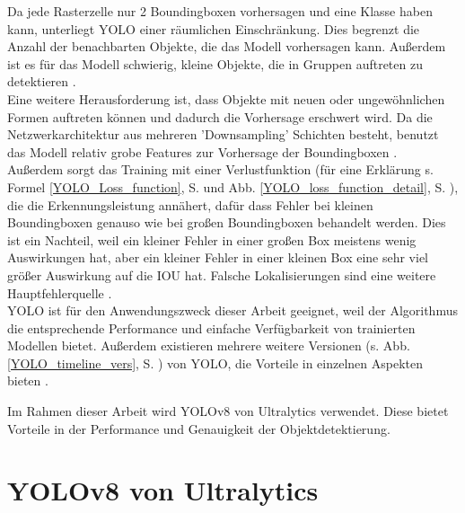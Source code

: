 {{	Da jede Rasterzelle nur 2 Boundingboxen vorhersagen und eine Klasse haben kann, unterliegt YOLO einer räumlichen Einschränkung. Dies begrenzt die Anzahl der benachbarten Objekte, die das Modell vorhersagen kann. Außerdem ist es für das Modell schwierig, kleine Objekte, die in Gruppen auftreten zu detektieren \citep{Redmon2016}. \\
	Eine weitere Herausforderung ist, dass Objekte mit neuen oder ungewöhnlichen Formen auftreten können und dadurch die Vorhersage erschwert wird. Da die Netzwerkarchitektur aus mehreren 'Downsampling' Schichten besteht, benutzt das Modell relativ grobe Features zur Vorhersage der Boundingboxen \citep{Redmon2016}. \\
	Außerdem sorgt das Training mit einer Verlustfunktion (für eine Erklärung s.  Formel \ref{YOLO_Loss_function}, S. \pageref{YOLO_Loss_function} und Abb.  \ref{YOLO_loss_function_detail}, S. \pageref{YOLO_loss_function_detail}), die die Erkennungsleistung annähert, dafür dass Fehler bei kleinen Boundingboxen genauso wie bei großen Boundingboxen behandelt werden. Dies ist ein Nachteil, weil ein kleiner Fehler in einer großen Box meistens wenig Auswirkungen hat, aber ein kleiner Fehler in einer kleinen Box eine sehr viel größer Auswirkung auf die IOU hat. Falsche Lokalisierungen sind eine weitere Hauptfehlerquelle \citep{Redmon2016}. \\
	YOLO ist für den Anwendungszweck dieser Arbeit geeignet, weil der Algorithmus die entsprechende Performance und einfache Verfügbarkeit von trainierten Modellen bietet. Außerdem existieren mehrere weitere Versionen (s. Abb. \ref{YOLO_timeline_vers}, S. \pageref{YOLO_timeline_vers}) von YOLO, die Vorteile in einzelnen Aspekten bieten \citep{Terven2023}. 

	Im Rahmen dieser Arbeit wird YOLOv8 von Ultralytics verwendet. Diese bietet Vorteile in der Performance und Genauigkeit der Objektdetektierung. 
	} 

	\section{YOLOv8 von Ultralytics}{ \label{subsec:YOLOv8_theoretic}
	
}}
